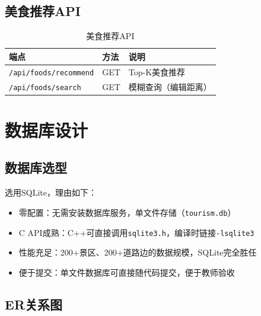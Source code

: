 \documentclass[12pt,a4paper]{report}
\begin{document}
\section{美食推荐API}

\begin{table}[H]
\centering
\caption{美食推荐API}
\small
\begin{tabularx}{\textwidth}{l l X}
\toprule
\textbf{端点} & \textbf{方法} & \textbf{说明} \\
\midrule
\texttt{/api/foods/recommend} & GET & Top-K美食推荐 \\
\texttt{/api/foods/search} & GET & 模糊查询（编辑距离） \\
\bottomrule
\end{tabularx}
\end{table}


\chapter{数据库设计}

\section{数据库选型}

选用SQLite，理由如下：
\begin{itemize}
    \item 零配置：无需安装数据库服务，单文件存储（\texttt{tourism.db}）
    \item C API成熟：C++可直接调用\texttt{sqlite3.h}，编译时链接\texttt{-lsqlite3}
    \item 性能充足：200+景区、200+道路边的数据规模，SQLite完全胜任
    \item 便于提交：单文件数据库可直接随代码提交，便于教师验收
\end{itemize}

\section{ER关系图}
\end{document}
